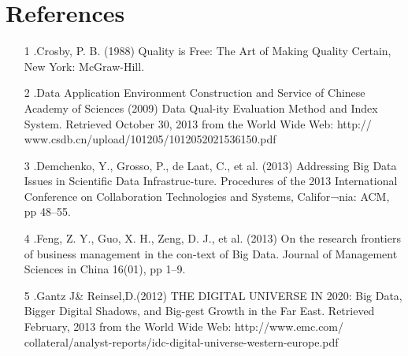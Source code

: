 \documentclass[12pt,]{article}
\begin{document}
\newpage
\section{References}
\begin{enumerate}
\item[1].Crosby, P. B. (1988) Quality is Free: The Art of Making Quality Certain, New York: McGraw-Hill. 
\item[2].Data Application Environment Construction and Service of Chinese Academy of Sciences (2009) Data Qual-ity Evaluation Method and Index System. Retrieved October 30, 2013 from the World Wide Web: http:// www.csdb.cn/upload/101205/1012052021536150.pdf 
\item[3].Demchenko, Y., Grosso, P., de Laat, C., et al. (2013) Addressing Big Data Issues in Scientific Data Infrastruc-ture. Procedures of the 2013 International Conference on Collaboration Technologies and Systems, Califor¬nia: ACM, pp 48–55. 
\item[4].Feng, Z. Y., Guo, X. H., Zeng, D. J., et al. (2013) On the research frontiers of business management in the con-text of Big Data. Journal of Management Sciences in China 16(01), pp 1–9. 
\item[5].Gantz J& Reinsel,D.(2012) THE DIGITAL UNIVERSE IN 2020: Big Data, Bigger Digital Shadows, and Big-gest Growth in the Far East. Retrieved February, 2013 from the World Wide Web: http://www.emc.com/ collateral/analyst-reports/idc-digital-universe-western-europe.pdf 
\end{enumerate}
\end{document}
